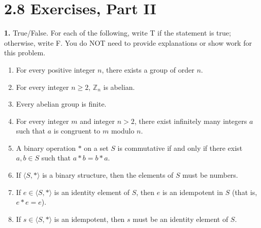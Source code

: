 \documentclass[10pt,]{book}
\theoremstyle{plain}
\theoremstyle{definition}
\theoremstyle{definition}
\theoremstyle{definition}
\theoremstyle{definition}
\numberwithin{equation}{section}
\def\Z{\mathbb{Z}}
\begin{document}
\section*{2.8 Exercises, Part II}
\noindent\textbf{1.}\quad{}
        True/False. For each of the following, write T if the statement is
        true; otherwise, write F. You do NOT need to provide explanations or show work for this problem.
        \leavevmode%
\begin{enumerate}[label=(\alph*)]
\item\hypertarget{li-95}{}
              For every positive integer \(n\), there exists a group of order \(n\).
\item\hypertarget{li-96}{}
              For every integer \(n\geq 2\), \(\Z_n\) is abelian.
\item\hypertarget{li-97}{}
              Every abelian group is finite.
\item\hypertarget{li-98}{}
              For every integer \(m\) and integer \(n>2\), there exist infinitely many integers \(a\) such that \(a\) is congruent to \(m\) modulo \(n\).
\item\hypertarget{li-99}{}
              A binary operation \(*\) on a set \(S\) is commutative if and only if there exist \(a,b\in S\) such that \(a*b=b*a\).
\item\hypertarget{li-100}{}
              If \(\langle S, *\rangle\) is a binary structure, then the elements of \(S\) must be numbers.
\item\hypertarget{li-101}{}
              If \(e\in \langle S,*\rangle\) is an identity element of \(S\), then \(e\) is an idempotent in \(S\) (that is, \(e*e=e\)).
\item\hypertarget{li-102}{}
              If \(s\in \langle S,*\rangle\) is an idempotent, then \(s\) must be an identity element of \(S\).
\end{enumerate}
\end{document}
